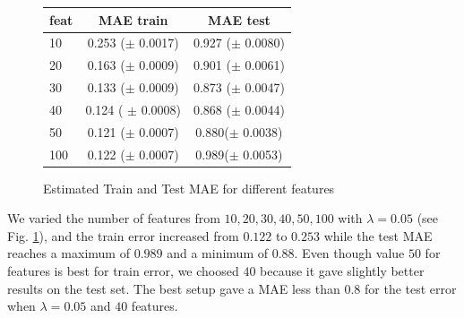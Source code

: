 \begin{figure}[h]
\begin{minipage}{\textwidth}
\begin{minipage}[b]{0.45\textwidth}
  \end{minipage}
  \hfill
  \begin{minipage}[b]{0.5\textwidth}
\begin{center}
  \begin{tabular}{ |l | c | c| }
    \hline
     feat & MAE train & MAE test \\ \hline
     10   & 0.253 ($\pm$  0.0017) &  0.927 ($\pm$ 0.0080) \\ \hline
     20  &  0.163 ($\pm$  0.0009) &  0.901 ($\pm$  0.0061) \\ \hline
     30     & 0.133 ($\pm$ 0.0009)  & 0.873 ($\pm$ 0.0047) \\ \hline
     40    & 0.124  ( $\pm$ 0.0008) & 0.868 ($\pm$  0.0044)\\ \hline
     50       & 0.121 ($\pm$ 0.0007) & 0.880($\pm$  0.0038)\\ \hline
     100    & 0.122 ($\pm$ 0.0007) & 0.989($\pm$  0.0053) \\
    \hline
  \end{tabular}
\end{center}
\vspace{10 mm}
    \end{minipage}
  \end{minipage}
  \caption{Estimated Train and Test MAE for different features}
  \label{fig:ALS_features}
\end{figure}
  
We varied the number of features from $10,20,30,40,50,100$ with $\lambda = 0.05$ (see Fig. \ref{fig:ALS_features}), and the train error increased from $0.122$ to $0.253$ while the test MAE reaches a maximum of $0.989$ and a minimum of $0.88$. Even though value $50$ for features is best for train error, we choosed $40$ because it gave slightly better results on the test set. The best setup gave a MAE less than $0.8$ for the test error when $\lambda=0.05$ and $40$ features.



